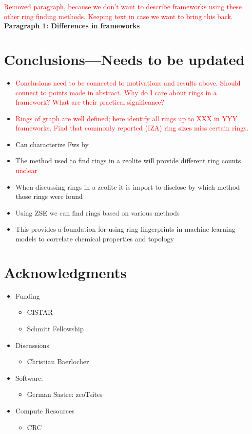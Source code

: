 \documentclass[11pt]{article}
\newcommand{\red}[1]{\textcolor{red}{#1}}
\begin{document}
\newpage
\red{Removed paragraph, because we don't want to describe frameworks using these other ring finding methods. Keeping text in case we want to bring this back.}
\textbf{\textbf{Paragraph 1: Differences in frameworks}}


\section{Conclusions---Needs to be updated}
\label{sec:orgd9045f5}
\begin{itemize}
\item \red{Conclusions need to be connected to motivations and results above. Should connect to points made in abstract. Why do I care about rings in a framework? What are their practical significance?}

\item \red{Rings of graph are well defined; here identify all rings up to XXX in YYY frameworks. Find that commonly reported (IZA) ring sizes miss certain rings.}

\item Can characterize Fws by
\end{itemize}


\begin{itemize}
\item The method used to find rings in a zeolite will provide different ring counts \red{unclear}
\item When discussing rings in a zeolite it is import to disclose by which method those rings were found
\item Using ZSE we can find rings based on various methods
\item This provides a foundation for using ring fingerprints in machine learning models to correlate chemical properties and topology
\end{itemize}





\section{Acknowledgments}
\label{sec:orgf859058}
\begin{itemize}
\item Funding
\begin{itemize}
\item CISTAR
\item Schmitt Fellowship
\end{itemize}
\item Discussions
\begin{itemize}
\item Christian Baerlocher
\end{itemize}
\item Software:
\begin{itemize}
\item German Sastre: zeoTsites
\end{itemize}
\item Compute Resources
\begin{itemize}
\item CRC
\end{itemize}
\end{itemize}
\end{document}
